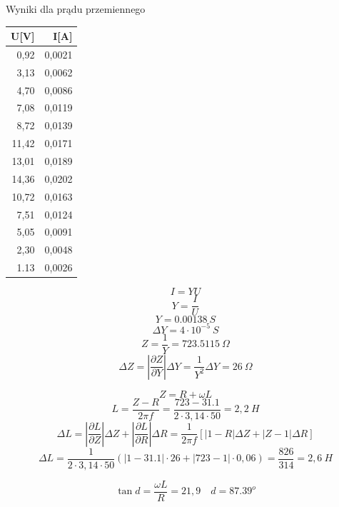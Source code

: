 \documentclass[11pt]{article}
\begin{document}
\begin{multicols}{2}

Wyniki dla prądu przemiennego

\begin{center}
\begin{tabular}{|r|r|}
\hline
	U[V] & I[A] \\
\hline
	0,92 & 0,0021\\
	3,13 & 0,0062\\
	4,70 & 0,0086\\
	7,08 & 0,0119\\
	8,72 & 0,0139\\
	11,42 & 0,0171\\
	13,01 & 0,0189\\
	14,36 & 0,0202\\
	10,72 & 0,0163\\
	7,51 & 0,0124\\
	5,05 & 0,0091\\
	2,30 & 0,0048\\
	1.13 & 0,0026\\
\hline
\end{tabular}
\end{center}
\columnbreak
$$ I = Y U $$
$$ Y = \frac{I}{U}$$
$$ Y = 0.00138 \ S $$
$$ \Delta Y = 4 \cdot 10^{-5}\ S $$
$$ Z = \frac{1}{Y} = 723.5115\ \Omega $$
$$ \Delta Z = \left| \frac{\partial Z}{\partial Y} \right| \Delta Y = \frac{1}{Y^2}\Delta Y = 26\ \Omega$$
\end{multicols}
$$ Z = R + \omega L $$
$$ L = \frac{Z - R}{2 \pi f} = \frac{723 - 31.1}{2 \cdot 3,14 \cdot 50} = 2,2\ H $$
$$ \Delta L = \left| \frac{\partial{L}}{\partial{Z}} \right| \Delta Z  + \left| \frac{\partial{L}}{\partial{R}} \right| \Delta R = \frac{1}{2 \pi f}\left[|1-R|\Delta Z + |Z - 1|\Delta R \right] $$
$$ \Delta L = \frac{1}{2 \cdot 3,14 \cdot 50} (|1 - 31.1|\cdot 26 + |723-1|\cdot 0,06) = \frac{826}{314} = 2,6\ H$$

$$ \tan{d} = \frac{\omega L}{R} = 21,9 \quad
d = 87.39^o $$
\end{document}
